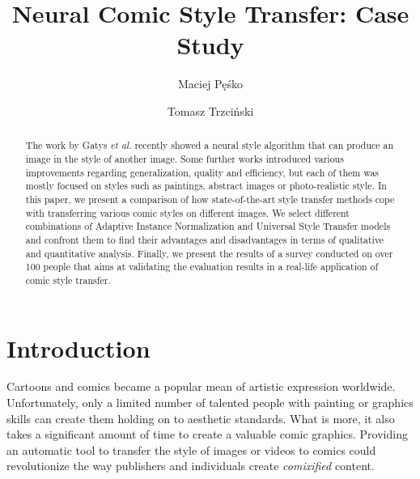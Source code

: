 \documentclass{llncs}
\begin{document}
\title{Neural Comic Style Transfer: Case Study}
%

\author{Maciej Pęśko \and Tomasz Trzciński}
%

\maketitle              %

\begin{abstract}
The work by Gatys \textit{et al}. \cite{gatys:} recently showed a neural style algorithm that can produce an image in the style of another image. Some further works introduced various improvements regarding generalization, quality and efficiency, but each of them was mostly focused on styles such as paintings, abstract images or photo-realistic style. In this paper, we present a comparison of how state-of-the-art style transfer methods cope with transferring various comic styles on different images. We select different combinations of Adaptive Instance Normalization \cite{huang:belongie} and Universal Style Transfer \cite{universal:style} models and confront them to find their advantages and disadvantages in terms of qualitative and quantitative analysis. Finally, we present the results of a survey conducted on over 100 people that aims at validating the evaluation results in a real-life application of comic style transfer.

\end{abstract}

%
\section{Introduction}
%
Cartoons and comics became a popular mean of artistic expression worldwide. Unfortunately, only a limited number of talented people with painting or graphics skills can create them holding on to aesthetic standards. What is more, it also takes a significant amount of time to create a valuable comic graphics. Providing an automatic tool to transfer the style of images or videos to comics could revolutionize the way publishers and individuals create {\it comixified} content.%
\end{document}
